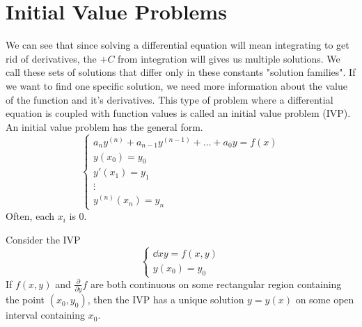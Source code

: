 \section{Initial Value Problems}
\noindent
We can see that since solving a differential equation will mean integrating to get rid of derivatives, the $+ C$ from integration will gives us multiple solutions. We call these sets of solutions that differ only in these constants "solution families". If we want to find one specific solution, we need more information about the value of the function and it's derivatives. This type of problem where a differential equation is coupled with function values is called an initial value problem (IVP).\\

\noindent
An initial value problem has the general form.
\begin{equation*}
	\begin{cases}
		a_ny^{(n)} + a_{n-1}y^{(n-1)} + \ldots + a_0y = f(x) \\
		y(x_0) = y_0 \\
		y'(x_1) = y_1 \\
		\vdots \\
		y^{(n)}(x_n) = y_n
	\end{cases}
\end{equation*}
Often, each $x_i$ is 0.

\ifodd{}\fi

\begin{theorem}
	Consider the IVP
	\begin{equation*}
		\begin{cases}
			\dd{x}{y} = f(x,y) \\
			y(x_0) = y_0
		\end{cases}
	\end{equation*}
	If $f(x,y)$ and $\frac{\partial}{\partial y}f$ are both continuous on some rectangular region containing the point $(x_0, y_0)$, then the IVP has a unique solution $y = y(x)$ on some open interval containing $x_0$.
\end{theorem}

\ifodd{}\fi